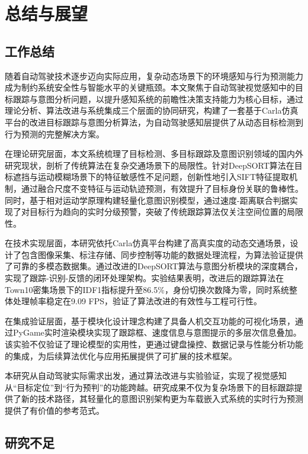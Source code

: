 
\chapter{总结与展望}

\section{工作总结}
随着自动驾驶技术逐步迈向实际应用，复杂动态场景下的环境感知与行为预测能力成为制约系统安全性与智能水平的关键瓶颈。本文聚焦于自动驾驶视觉感知中的目标跟踪与意图分析问题，以提升感知系统的前瞻性决策支持能力为核心目标，通过理论分析、算法改进与系统集成三个层面的协同研究，构建了一套基于Carla仿真平台的改进目标跟踪与意图分析算法，为自动驾驶感知层提供了从动态目标检测到行为预测的完整解决方案。

在理论研究层面，本文系统梳理了目标检测、多目标跟踪及意图识别领域的国内外研究现状，剖析了传统算法在复杂交通场景下的局限性。针对DeepSORT算法在目标遮挡与运动模糊场景下的特征敏感性不足问题，创新性地引入SIFT特征提取机制，通过融合尺度不变特征与运动轨迹预测，有效提升了目标身份关联的鲁棒性。同时，基于相对运动学原理构建轻量化意图识别模型，通过速度-距离联合判据实现了对目标行为趋向的实时分级预警，突破了传统跟踪算法仅关注空间位置的局限性。

在技术实现层面，本研究依托Carla仿真平台构建了高真实度的动态交通场景，设计了包含图像采集、标注存储、同步控制等功能的数据处理流程，为算法验证提供了可靠的多模态数据集。通过改进的DeepSORT算法与意图分析模块的深度耦合，实现了跟踪-识别-反馈的闭环处理架构。实验结果表明，改进后的跟踪算法在Town10密集场景下的IDF1指标提升至86.5\%，身份切换次数降为零，同时系统整体处理帧率稳定在9.09 FPS，验证了算法改进的有效性与工程可行性。

在集成验证层面，基于模块化设计理念构建了具备人机交互功能的可视化场景，通过PyGame实时渲染模块实现了跟踪框、速度信息与意图提示的多层次信息叠加。该实验不仅验证了理论模型的实用性，更通过键盘操控、数据记录与性能分析功能的集成，为后续算法优化与应用拓展提供了可扩展的技术框架。

本研究从自动驾驶实际需求出发，通过算法改进与实验验证，实现了视觉感知从“目标定位”到“行为预判”的功能跨越。研究成果不仅为复杂场景下的目标跟踪提供了新的技术路径，其轻量化的意图识别架构更为车载嵌入式系统的实时行为预测提供了有价值的参考范式。

\section{研究不足}

